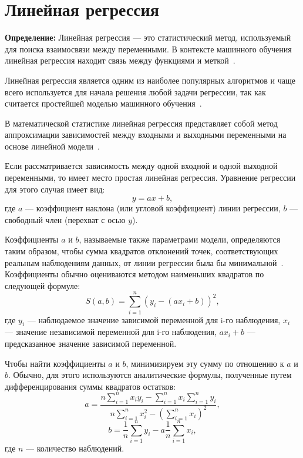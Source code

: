\section{Линейная регрессия}

\textbf{ Определение:} Линейная регрессия --- это статистический метод, используемый для поиска взаимосвязи между переменными.
В контексте машинного обучения линейная регрессия находит связь между функциями и меткой~\cite{google}.

Линейная регрессия является одним из наиболее популярных алгоритмов и чаще всего используется для начала решения любой задачи регрессии, так как считается простейшей моделью машинного обучения~\cite{kemer}.

В математической статистике линейная регрессия представляет собой метод аппроксимации зависимостей между входными и выходными переменными на основе линейной модели~\cite{loginom}.

Если рассматривается зависимость между одной входной и одной выходной переменными, то имеет место простая линейная регрессия.
Уравнение регрессии для этого случая имеет вид:
\begin{equation}
    y = ax + b,
\end{equation}
где $a$ --- коэффициент наклона (или угловой коэффициент) линии регрессии, $b$ --- свободный член (перехват с осью $y$).

Коэффициенты $a$ и $b$, называемые также параметрами модели, определяются таким образом, чтобы сумма квадратов отклонений точек, соответствующих реальным наблюдениям данных, от линии регрессии была бы минимальной~\cite{loginom}.
Коэффициенты обычно оцениваются методом наименьших квадратов по следующей формуле:
\begin{equation}
   S(a, b) = \sum_{i=1}^{n}(y_i - (ax_i + b))^2,
\end{equation}
где $y_i$ --- наблюдаемое значение зависимой переменной для i-го наблюдения, $x_i$ --- значение независимой переменной для i-го наблюдения, $ax_i + b$ --- предсказанное значение зависимой переменной.

Чтобы найти коэффициенты $a$ и $b$, минимизируем эту сумму по отношению к $a$ и $b$.
Обычно, для этого используются аналитические формулы, полученные путем дифференцирования суммы квадратов остатков:
\begin{equation}
    a = \frac{n \sum_{i=1}^{n} x_i y_i - \sum_{i=1}^{n} x_i \sum_{i=1}^{n} y_i}{n \sum_{i=1}^{n} x_i^2 - (\sum_{i=1}^{n} x_i)^2},
\end{equation}
\begin{equation}
    b = \frac{1}{n}\sum_{i=1}^{n} y_i - a\frac{1}{n}\sum_{i=1}^{n} x_i,
\end{equation}
где $n$ --- количество наблюдений.

